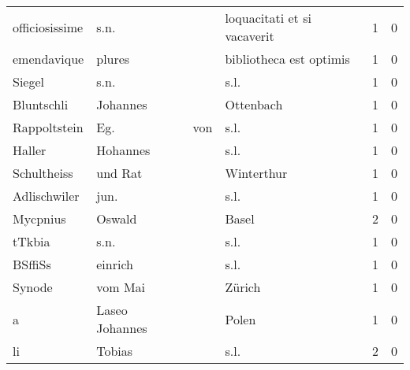 \documentclass[10pt,a4paper,landscape]{article}
\begin{document}
\begin{longtable}{llllrr}
           officiosissime &                               s.n. &             &                 loquacitati et si vacaverit &          1 &         0 \\
              emendavique &                             plures &             &                     bibliotheca est optimis &          1 &         0 \\
                   Siegel &                               s.n. &             &                                        s.l. &          1 &         0 \\
               Bluntschli &                           Johannes &             &                                   Ottenbach &          1 &         0 \\
             Rappoltstein &                                Eg. &         von &                                        s.l. &          1 &         0 \\
                   Haller &                           Hohannes &             &                                        s.l. &          1 &         0 \\
              Schultheiss &                            und Rat &             &                                  Winterthur &          1 &         0 \\
             Adlischwiler &                               jun. &             &                                        s.l. &          1 &         0 \\
                 Mycpnius &                             Oswald &             &                                       Basel &          2 &         0 \\
                   tTkbia &                               s.n. &             &                                        s.l. &          1 &         0 \\
                  BSffiSs &                            einrich &             &                                        s.l. &          1 &         0 \\
                   Synode &                            vom Mai &             &                                      Zürich &          1 &         0 \\
                        a &                     Laseo Johannes &             &                                       Polen &          1 &         0 \\
                       li &                             Tobias &             &                                        s.l. &          2 &         0 \\

\end{longtable}
\end{document}
